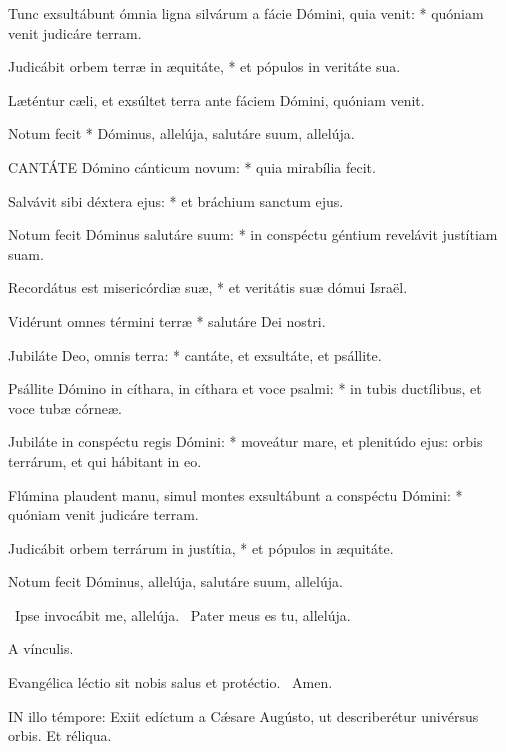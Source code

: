 Tunc exsultábunt ómnia ligna silvárum a fácie Dómini, quia venit: * quóniam venit judicáre terram.

Judicábit orbem terræ in æquitáte, * et pópulos in veritáte sua.

 Læténtur cæli, et exsúltet terra ante fáciem Dómini, quóniam venit.

 Notum fecit * Dóminus, allelúja, salutáre suum, allelúja.


\lettrine[lines=2]{C}{ANTÁTE} Dómino cánticum novum: * quia mirabília fecit.

Salvávit sibi déxtera ejus: * et bráchium sanctum ejus.

Notum fecit Dóminus salutáre suum: * in conspéctu géntium revelávit justítiam suam.

Recordátus est misericórdiæ suæ, * et veritátis suæ dómui Israël.

Vidérunt omnes términi terræ * salutáre Dei nostri.

Jubiláte Deo, omnis terra: * cantáte, et exsultáte, et psállite.

Psállite Dómino in cíthara, in cíthara et voce psalmi: * in tubis ductílibus, et voce tubæ córneæ.

Jubiláte in conspéctu regis Dómini: * moveátur mare, et plenitúdo ejus: orbis terrárum, et qui hábitant in eo.

Flúmina plaudent manu, simul montes exsultábunt a conspéctu Dómini: * quóniam venit judicáre terram.

Judicábit orbem terrárum in justítia, * et pópulos in æquitáte.

 Notum fecit Dóminus, allelúja, salutáre suum, allelúja.

\V\ Ipse invocábit me, allelúja. \R\ Pater meus es tu, allelúja.

 A vínculis.

 Evangélica léctio sit nobis salus et protéctio. \R\ Amen.



\lettrine[lines=2]{I}{N} illo témpore: Exiit edíctum a Cǽsare Augústo, ut describerétur univérsus orbis. Et réliqua.



